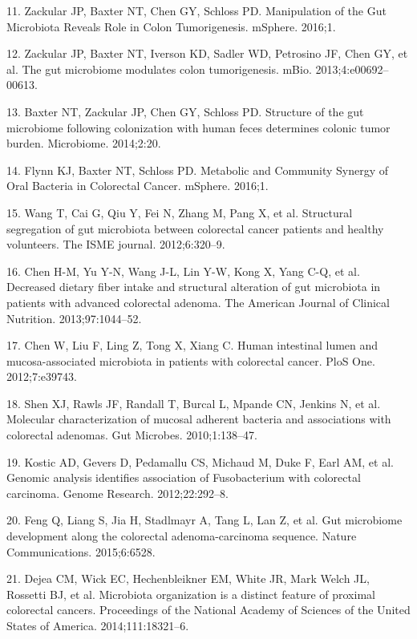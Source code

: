 \documentclass[12pt,]{article}
\begin{document}
\hypertarget{ref-zackular_manipulation_2016}{}
11. Zackular JP, Baxter NT, Chen GY, Schloss PD. Manipulation of the Gut
Microbiota Reveals Role in Colon Tumorigenesis. mSphere. 2016;1.

\hypertarget{ref-zackular_gut_2013}{}
12. Zackular JP, Baxter NT, Iverson KD, Sadler WD, Petrosino JF, Chen
GY, et al. The gut microbiome modulates colon tumorigenesis. mBio.
2013;4:e00692--00613.

\hypertarget{ref-baxter_structure_2014}{}
13. Baxter NT, Zackular JP, Chen GY, Schloss PD. Structure of the gut
microbiome following colonization with human feces determines colonic
tumor burden. Microbiome. 2014;2:20.

\hypertarget{ref-flynn_metabolic_2016}{}
14. Flynn KJ, Baxter NT, Schloss PD. Metabolic and Community Synergy of
Oral Bacteria in Colorectal Cancer. mSphere. 2016;1.

\hypertarget{ref-wang_structural_2012}{}
15. Wang T, Cai G, Qiu Y, Fei N, Zhang M, Pang X, et al. Structural
segregation of gut microbiota between colorectal cancer patients and
healthy volunteers. The ISME journal. 2012;6:320--9.

\hypertarget{ref-chen_decreased_2013}{}
16. Chen H-M, Yu Y-N, Wang J-L, Lin Y-W, Kong X, Yang C-Q, et al.
Decreased dietary fiber intake and structural alteration of gut
microbiota in patients with advanced colorectal adenoma. The American
Journal of Clinical Nutrition. 2013;97:1044--52.

\hypertarget{ref-chen_human_2012}{}
17. Chen W, Liu F, Ling Z, Tong X, Xiang C. Human intestinal lumen and
mucosa-associated microbiota in patients with colorectal cancer. PloS
One. 2012;7:e39743.

\hypertarget{ref-shen_molecular_2010}{}
18. Shen XJ, Rawls JF, Randall T, Burcal L, Mpande CN, Jenkins N, et al.
Molecular characterization of mucosal adherent bacteria and associations
with colorectal adenomas. Gut Microbes. 2010;1:138--47.

\hypertarget{ref-kostic_genomic_2012}{}
19. Kostic AD, Gevers D, Pedamallu CS, Michaud M, Duke F, Earl AM, et
al. Genomic analysis identifies association of Fusobacterium with
colorectal carcinoma. Genome Research. 2012;22:292--8.

\hypertarget{ref-feng_gut_2015}{}
20. Feng Q, Liang S, Jia H, Stadlmayr A, Tang L, Lan Z, et al. Gut
microbiome development along the colorectal adenoma-carcinoma sequence.
Nature Communications. 2015;6:6528.

\hypertarget{ref-dejea_microbiota_2014}{}
21. Dejea CM, Wick EC, Hechenbleikner EM, White JR, Mark Welch JL,
Rossetti BJ, et al. Microbiota organization is a distinct feature of
proximal colorectal cancers. Proceedings of the National Academy of
Sciences of the United States of America. 2014;111:18321--6.
\end{document}
